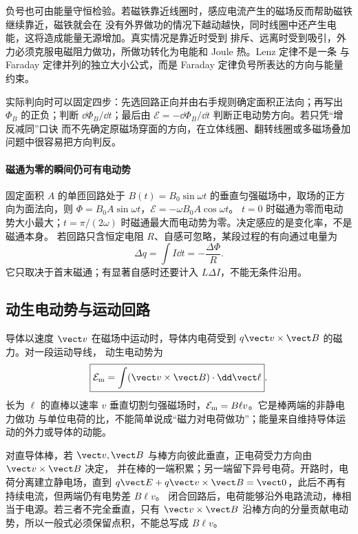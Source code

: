 负号也可由能量守恒检验。若磁铁靠近线圈时，感应电流产生的磁场反而帮助磁铁继续靠近，磁铁就会在
没有外界做功的情况下越动越快，同时线圈中还产生电能，这将造成能量无源增加。真实情况是靠近时受到
排斥、远离时受到吸引，外力必须克服电磁阻力做功，所做功转化为电能和 Joule 热。Lenz 定律不是一条
与 Faraday 定律并列的独立大小公式，而是 Faraday 定律负号所表达的方向与能量约束。

实际判向时可以固定四步：先选回路正向并由右手规则确定面积正法向；再写出 $\Phi_B$ 的正负；判断
$\dd\Phi_B/\dd t$；最后由 $\mathcal E=-\dd\Phi_B/\dd t$ 判断正电动势方向。若只凭“增反减同”口诀
而不先确定原磁场穿面的方向，在立体线圈、翻转线圈或多磁场叠加问题中很容易把方向判反。


\paragraph{磁通为零的瞬间仍可有电动势}
固定面积 $A$ 的单匝回路处于 $B(t)=B_0\sin\omega t$ 的垂直匀强磁场中，取场的正方向为面法向，则
$\Phi=B_0A\sin\omega t$，$\mathcal E=-\omega B_0A\cos\omega t$。
$t=0$ 时磁通为零而电动势大小最大；$t=\pi/(2\omega)$ 时磁通最大而电动势为零。决定感应的是变化率，不是磁通本身。
若回路只含恒定电阻 $R$、自感可忽略，某段过程的有向通过电量为
\[
 \Delta q=\int I\dd t=-\frac{\Delta\Phi}{R}.
\]
它只取决于首末磁通；有显著自感时还要计入 $L\Delta I$，不能无条件沿用。

\subsection{动生电动势与运动回路}

导体以速度 $\vect v$ 在磁场中运动时，导体内电荷受到 $q\vect v\times\vect B$ 的磁力。对一段运动导线，
动生电动势为
\begin{equation}
  \boxed{\mathcal E_{\rm m}=\int(\vect v\times\vect B)\cdot\dd\vect\ell}.
\end{equation}
长为 $\ell$ 的直棒以速率 $v$ 垂直切割匀强磁场时，$\mathcal E_{\rm m}=B\ell v$。它是棒两端的非静电力做功
与单位电荷的比，不能简单说成“磁力对电荷做功”；能量来自维持导体运动的外力或导体的动能。

对直导体棒，若 $\vect v,\vect B$ 与棒方向彼此垂直，正电荷受力方向由 $\vect v\times\vect B$ 决定，
并在棒的一端积累；另一端留下异号电荷。开路时，电荷分离建立静电场，直到
$q\vect E+q\vect v\times\vect B=\vect0$，此后不再有持续电流，但两端仍有电势差 $B\ell v$。
闭合回路后，电荷能够沿外电路流动，棒相当于电源。若三者不完全垂直，只有
$\vect v\times\vect B$ 沿棒方向的分量贡献电动势，所以一般式必须保留点积，不能总写成 $B\ell v$。

